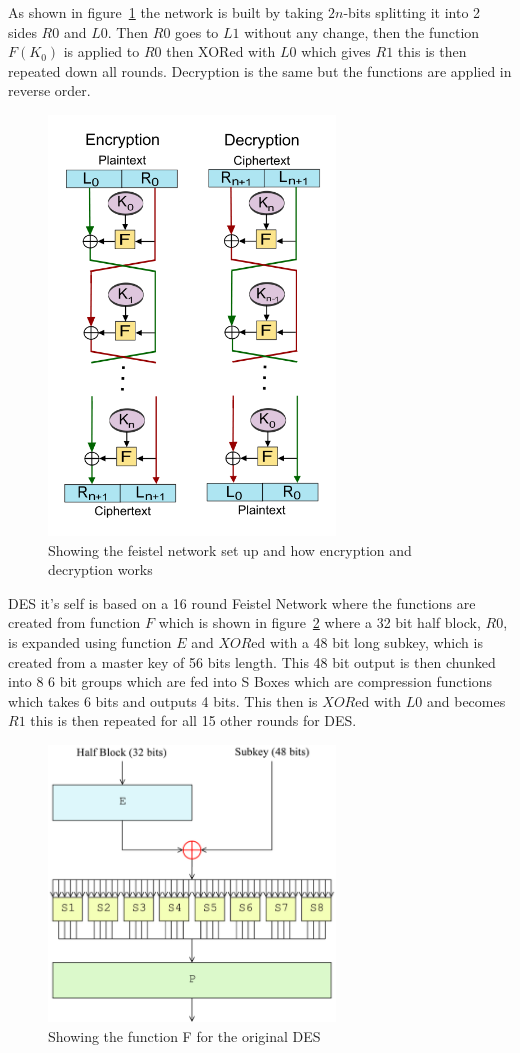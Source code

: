 \documentclass[12pt]{article}
\begin{document}
As shown in figure~\ref{fig:feistNetwork} the network is built by taking $2n$-bits splitting it into 2 sides $R0$ and $L0$. Then $R0$ goes to $L1$ without any change, then the function $F(K_0)$ is applied to $R0$ then XORed with $L0$ which gives $R1$ this is then repeated down all rounds. Decryption is the same but the functions are applied in reverse order.

\begin{figure}
    \center
    \includegraphics[width=3in]{feistNetwork.png}
    \caption{Showing the feistel network set up and how encryption and decryption works}
    \label{fig:feistNetwork}
\end{figure}

DES it's self is based on a 16 round Feistel Network where the functions are created from function $F$ which is shown in figure~\ref{fig:functionF} where a 32 bit half block, $R0$, is expanded using function $E$ and $XOR$ed with a 48 bit long subkey, which is created from a master key of 56 bits length. This 48 bit output is then chunked into 8 6 bit groups which are fed into S Boxes which are compression functions which takes 6 bits and outputs 4 bits. This then is $XOR$ed with $L0$ and becomes $R1$ this is then repeated for all 15 other rounds for DES.

\begin{figure}
    \center
    \includegraphics[width=3in]{functionF.png}
    \caption{Showing the function F for the original DES}
    \label{fig:functionF}
\end{figure}
\end{document}
